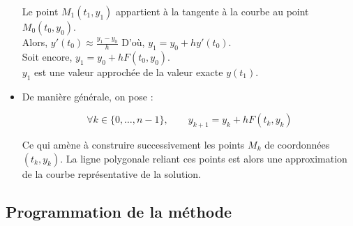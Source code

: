 \begin{itemize}
\begin{minipage}{0.5\linewidth}
		Le point $M_1(t_1,y_1)$ appartient à la tangente à la courbe au point $M_0(t_0,y_0)$.\\
		Alors, $y'(t_0) \approx \displaystyle\frac{y_1-y_0}{h}$
		D'où, $y_1=y_0+hy'(t_0)$.\\
		Soit encore, $y_1=y_0+hF(t_0,y_0)$.\\
		$y_1$ est une valeur approchée de la valeur exacte $y(t_1)$.
		
	\end{minipage}
	
	
	
	\item De manière générale, on pose :
	
	\[\forall k\in\{0,\dots,n-1\},\qquad y_{k+1}=y_k+hF(t_k,y_k)\]
	
	Ce qui amène à construire successivement les points $M_k$ de coordonnées $(t_k,y_k)$. La ligne polygonale reliant ces points est alors une approximation de la courbe représentative de la solution.
	
\end{itemize}

\subsection*{Programmation de la méthode }


	
